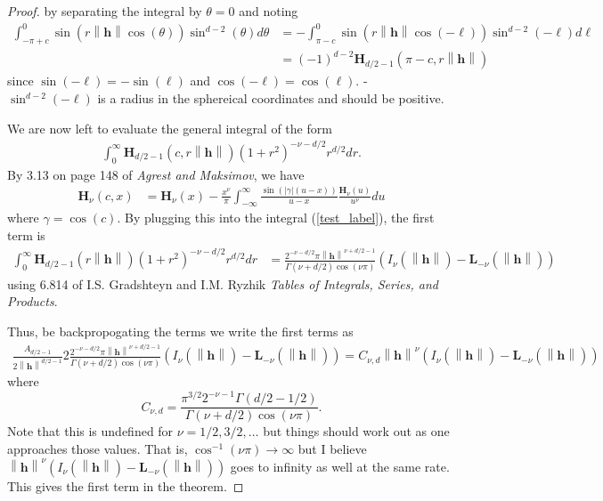 \documentclass[11pt]{article}
\newcommand{\hh}{\left\lVert \boldsymbol{h}\right\rVert}
\begin{document}
\begin{proof}
\pagebreak
by separating the integral by $\theta = 0$ and noting \begin{align*}
\int_{-\pi+c}^0 \sin(r\hh\cos(\theta)) \sin^{d-2}(\theta) d\theta &= -\int_{\pi-c}^0 \sin(r\hh\cos(-\ell))\sin^{d-2}(-\ell) d\ell \\
&=(-1)^{d-2} \boldsymbol{H}_{d/2-1}(\pi- c, r\hh) 
\end{align*}since $\sin(-\ell) = -\sin(\ell)$ and $\cos(-\ell) = \cos(\ell)$.  - $\sin^{d-2}(-\ell)$ is a radius in the sphereical coordinates and should be positive.

We are now left to evaluate the general integral of the form \begin{align}
\int_0^\infty \boldsymbol{H}_{d/2 - 1}(c,r\hh) (1+ r^2)^{-\nu-d/2} r^{d/2}dr.\label{test_label}
\end{align}By 3.13 on page 148 of \textit{Agrest and Maksimov}, we have \begin{align}
  \boldsymbol{H}_\nu(c, x) &= \boldsymbol{H}_\nu(x) - \frac{x^\nu}{\pi} \int_{-\infty}^\infty \frac{\sin(|\gamma|(u-x))}{u-x}\frac{\boldsymbol{H}_\nu(u)}{u^\nu} du\label{incomplete_complete}
\end{align}where $\gamma = \cos(c)$. By plugging this into the integral (\ref{test_label}), the first term is \begin{align*}
\int_0^\infty \boldsymbol{H}_{d/2 - 1}(r\hh) (1+ r^2)^{-\nu-d/2} r^{d/2}dr &= \frac{2^{-\nu - d/2}\pi \hh^{\nu+d/2-1}}{\Gamma(\nu + d/2)\cos(\nu\pi)}\left(I_{\nu}(\hh) - \boldsymbol{L}_{-\nu}(\hh)\right)
\end{align*}using 6.814 of I.S. Gradshteyn and I.M. Ryzhik \textit{Tables of Integrals, Series, and Products}. 

Thus, be backpropogating the terms we write the first terms as \begin{align*}
\frac{A_{d/2-1}}{2\hh^{d/2-1}}2\frac{2^{-\nu - d/2}\pi \hh^{\nu+d/2-1}}{\Gamma(\nu + d/2)\cos(\nu\pi)}\left(I_{\nu}(\hh) - \boldsymbol{L}_{-\nu}(\hh)\right)=C_{\nu,d}\hh^{\nu}\left(I_{\nu}(\hh) - \boldsymbol{L}_{-\nu}(\hh)\right)
\end{align*}where $$C_{\nu,d} = \frac{\pi^{3/2}2^{-\nu - 1}\Gamma(d/2 - 1/2)}{\Gamma(\nu + d/2) \cos(\nu\pi)}.$$Note that this is undefined for $\nu = 1/2, 3/2, \dots$ but things should work out as one approaches those values. That is, $\cos^{-1}(\nu\pi) \to \infty$ but I believe $\hh^\nu(I_{\nu}(\hh) - \boldsymbol{L}_{-\nu}(\hh))$ goes to infinity as well at the same rate. This gives the first term in the theorem.


\end{proof}
\end{document}
